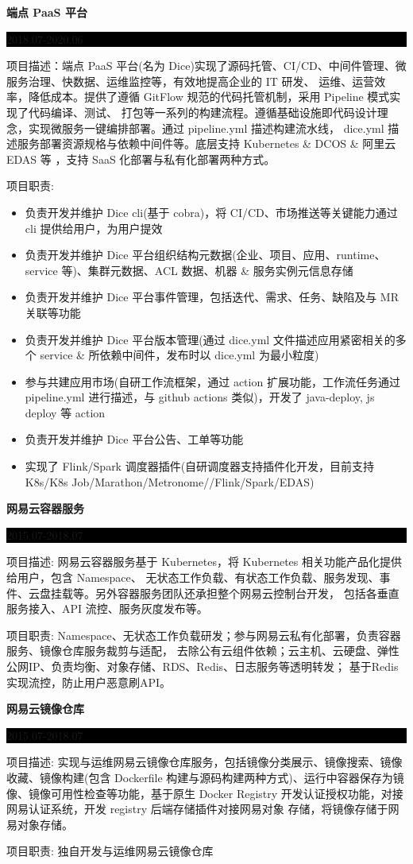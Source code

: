 \documentclass[paper=a4,fontsize=11pt]{scrartcl} %
\newcommand{\sepspace}{\vspace*{1em}}		%
\newcommand{\SubSection}[2]{
	\sepspace \noindent \textbf{#1} \hfill      %
	\colorbox{Black}{\parbox{7em}{\hfill\color{White}#2}} \par  %
	\normalsize \par \sepspace}
\begin{document}
\begin{CJK}{UTF8}{gbsn}
\SubSection{端点 PaaS 平台}{2018.07-2020.06}
项目描述：端点 PaaS 平台(名为 Dice)实现了源码托管、CI/CD、中间件管理、微服务治理、快数据、运维监控等，有效地提高企业的 IT 研发、
运维、运营效率，降低成本。提供了遵循 GitFlow 规范的代码托管机制，采用 Pipeline 模式实现了代码编译、测试、
打包等一系列的构建流程。遵循基础设施即代码设计理念，实现微服务一键编排部署。通过 pipeline.yml 描述构建流水线，
dice.yml 描述服务部署资源规格与依赖中间件等。底层支持 Kubernetes \& DCOS \& 阿里云 EDAS 等 ，支持 SaaS 化部署与私有化部署两种方式。\par
\sepspace
项目职责:  
\begin{itemize}
\item 负责开发并维护 Dice cli(基于 cobra)，将 CI/CD、市场推送等关键能力通过 cli 提供给用户，为用户提效
\item 负责开发并维护 Dice 平台组织结构元数据(企业、项目、应用、runtime、service 等)、集群元数据、ACL 数据、机器 \& 服务实例元信息存储
\item 负责开发并维护 Dice 平台事件管理，包括迭代、需求、任务、缺陷及与 MR 关联等功能
\item 负责开发并维护 Dice 平台版本管理(通过 dice.yml 文件描述应用紧密相关的多个 service \& 所依赖中间件，发布时以 dice.yml 为最小粒度)
\item 参与共建应用市场(自研工作流框架，通过 action 扩展功能，工作流任务通过 pipeline.yml 进行描述，与 github actions 类似)，开发了 java-deploy, js deploy 等 action
\item 负责开发并维护 Dice 平台公告、工单等功能
\item 实现了 Flink/Spark 调度器插件(自研调度器支持插件化开发，目前支持 K8s/K8s Job/Marathon/Metronome//Flink/Spark/EDAS)
\end{itemize}

\SubSection{网易云容器服务}{2015.07-2018.07}
项目描述: 网易云容器服务基于 Kubernetes，将 Kubernetes 相关功能产品化提供给用户，包含 Namespace、
无状态工作负载、有状态工作负载、服务发现、事件、云盘挂载等。另外容器服务团队还承担整个网易云控制台开发，
包括各垂直服务接入、API 流控、服务灰度发布等。\par
\sepspace
项目职责: Namespace、无状态工作负载研发；参与网易云私有化部署，负责容器服务、镜像仓库服务裁剪与适配，
去除公有云组件依赖；云主机、云硬盘、弹性公网IP、负责均衡、对象存储、RDS、Redis、日志服务等透明转发；
基于Redis实现流控，防止用户恶意刷API。

\SubSection{网易云镜像仓库}{2015.07-2018.07}
项目描述: 实现与运维网易云镜像仓库服务，包括镜像分类展示、镜像搜索、镜像收藏、镜像构建(包含
Dockerfile 构建与源码构建两种方式)、运行中容器保存为镜像、镜像可用性检查等功能，基于原生
Docker Registry 开发认证授权功能，对接网易认证系统，开发 registry 后端存储插件对接网易对象
存储，将镜像存储于网易对象存储。\par
\sepspace
项目职责: 独自开发与运维网易云镜像仓库


\end{CJK}
\end{document}
